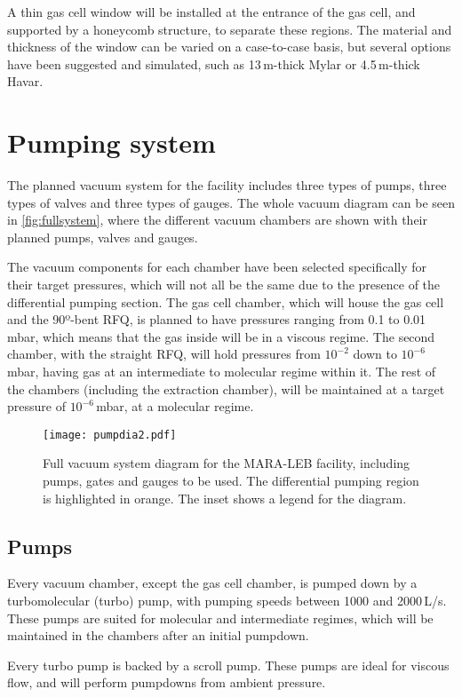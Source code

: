 A thin gas cell window will be installed at the entrance of the gas cell, and supported by a honeycomb structure, to separate these regions. The material and thickness of the window can be varied on a case-to-case basis, but several options have been suggested and simulated, such as 13\,\textmu m-thick Mylar or 4.5\,\textmu m-thick Havar.

\section{Pumping system}
\label{sec:pump}

The planned vacuum system for the facility includes three types of pumps, three types of valves and three types of gauges. The whole vacuum diagram can be seen in \autoref{fig:fullsystem}, where the different vacuum chambers are shown with their planned pumps, valves and gauges.

The vacuum components for each chamber have been selected specifically for their target pressures, which will not all be the same due to the presence of the differential pumping section. The gas cell chamber, which will house the gas cell and the 90º-bent RFQ, is planned to have pressures ranging from 0.1 to 0.01\,mbar, which means that the gas inside will be in a viscous regime. The second chamber, with the straight RFQ, will hold pressures from $10^{-2}$ down to $10^{-6}$\,mbar, having gas at an intermediate to molecular regime within it. The rest of the chambers (including the extraction chamber), will be maintained at a target pressure of $10^{-6}$\,mbar, at a molecular regime. 

\begin{figure}[h]
    \centering
    \texttt{[image: pumpdia2.pdf]}
     \caption{Full vacuum system diagram for the MARA-LEB facility, including pumps, gates and gauges to be used. The differential pumping region is highlighted in orange. The inset shows a legend for the diagram.}
     \label{fig:fullsystem}
 \end{figure}

\subsection{Pumps}
Every vacuum chamber, except the gas cell chamber, is pumped down by a turbomolecular (turbo) pump, with pumping speeds between 1000 and 2000\,L/s. These pumps are suited for molecular and intermediate regimes, which will be maintained in the chambers after an initial pumpdown.

Every turbo pump is backed by a scroll pump. These pumps are ideal for viscous flow, and will perform pumpdowns from ambient pressure. 




